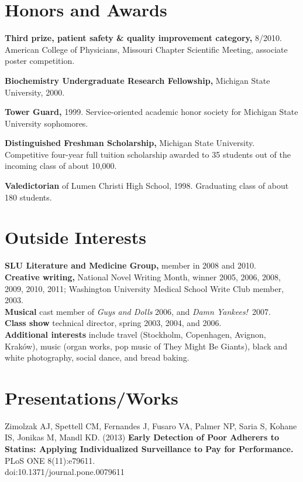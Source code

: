 \documentclass[12pt]{article}
\begin{document}
\section*{Honors and Awards}

\textbf{Third prize, patient safety \& quality improvement category,} 8/2010.
American College of Physicians, Missouri Chapter Scientific Meeting,
associate poster competition.

\textbf{Biochemistry Undergraduate Research Fellowship,} Michigan State
University, 2000.

\textbf{Tower Guard,} 1999. Service-oriented academic honor
society for Michigan State University sophomores.

\textbf{Distinguished Freshman Scholarship,} Michigan State
University. Competitive four-year full tuition scholarship awarded to
35 students out of the incoming class of about 10,000.

\textbf{Valedictorian} of Lumen Christi High School, 1998. Graduating
class of about 180 students.

\section*{Outside Interests}

\textbf{SLU Literature and Medicine Group,} member in 2008 and 2010.\\
\textbf{Creative writing,} National Novel Writing Month, winner 2005, 2006,
2008, 2009, 2010, 2011; Washington University Medical School Write Club
member, 2003.\\
\textbf{Musical} cast member of \emph{Guys and Dolls} 2006, and
\emph{Damn Yankees!}\ 2007.\\
\textbf{Class show} technical director, spring 2003, 2004, and 2006.\\
\textbf{Additional interests} include travel (Stockholm, Copenhagen, Avignon,
Krak\'ow), music (organ works, pop music of They Might Be Giants), black
and white photography, social dance, and bread baking.

\section*{Presentations/Works}
Zimolzak AJ, Spettell CM, Fernandes J, Fusaro VA, Palmer NP, Saria S,
Kohane IS, Jonikas M, Mandl KD. (2013) \textbf{Early Detection of Poor
  Adherers to Statins: Applying Individualized Surveillance to Pay for
  Performance.} PLoS ONE 8(11):e79611. \\
doi:10.1371/journal.pone.0079611
\end{document}
